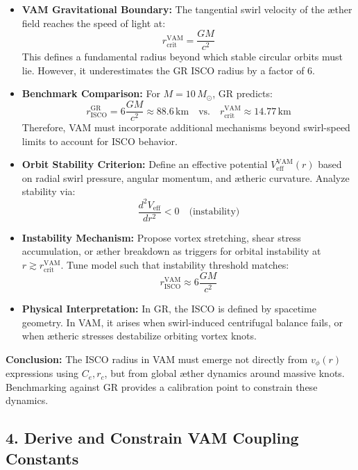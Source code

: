 \documentclass[a4paper, aps,preprint,superscriptaddress, 12pt]{revtex4}
\begin{document}
\begin{itemize}
    \item \textbf{VAM Gravitational Boundary:} The tangential swirl velocity of the æther field reaches the speed of light at:
    \[
    r_\text{crit}^{\text{VAM}} = \frac{GM}{c^2}
    \]
    This defines a fundamental radius beyond which stable circular orbits must lie. However, it underestimates the GR ISCO radius by a factor of 6.

    \item \textbf{Benchmark Comparison:} For \( M = 10\,M_\odot \), GR predicts:
    \[
    r_{\text{ISCO}}^{\text{GR}} = 6 \frac{GM}{c^2} \approx 88.6\,\text{km}
    \quad\text{vs.}\quad
    r_\text{crit}^{\text{VAM}} \approx 14.77\,\text{km}
    \]
    Therefore, VAM must incorporate additional mechanisms beyond swirl-speed limits to account for ISCO behavior.

    \item \textbf{Orbit Stability Criterion:} Define an effective potential \( V_\text{eff}^{\text{VAM}}(r) \) based on radial swirl pressure, angular momentum, and ætheric curvature. Analyze stability via:
    \[
    \frac{d^2 V_\text{eff}}{dr^2} < 0 \quad \text{(instability)}
    \]

    \item \textbf{Instability Mechanism:} Propose vortex stretching, shear stress accumulation, or æther breakdown as triggers for orbital instability at \( r \gtrsim r_\text{crit}^{\text{VAM}} \). Tune model such that instability threshold matches:
    \[
    r_{\text{ISCO}}^{\text{VAM}} \approx 6 \frac{GM}{c^2}
    \]

    \item \textbf{Physical Interpretation:} In GR, the ISCO is defined by spacetime geometry. In VAM, it arises when swirl-induced centrifugal balance fails, or when ætheric stresses destabilize orbiting vortex knots.
\end{itemize}

\noindent
\textbf{Conclusion:} The ISCO radius in VAM must emerge not directly from \( v_\phi(r) \) expressions using \( C_e, r_c \), but from global æther dynamics around massive knots. Benchmarking against GR provides a calibration point to constrain these dynamics.

\subsection*{4. Derive and Constrain VAM Coupling Constants}
\end{document}
